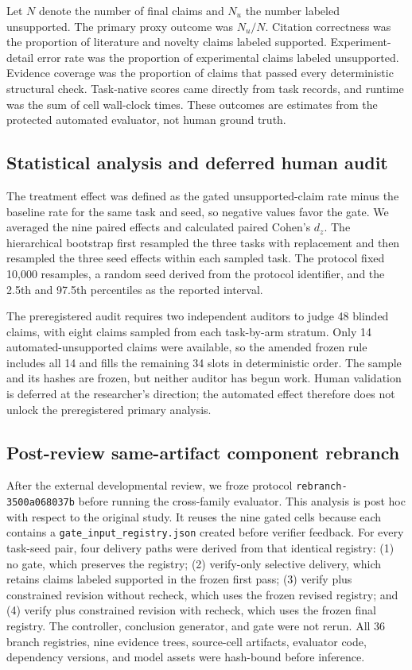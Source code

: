 \documentclass[11pt]{article}
\begin{document}
Let $N$ denote the number of final claims and $N_u$ the number labeled unsupported. The primary proxy outcome was $N_u/N$. Citation correctness was the proportion of literature and novelty claims labeled supported. Experiment-detail error rate was the proportion of experimental claims labeled unsupported. Evidence coverage was the proportion of claims that passed every deterministic structural check. Task-native scores came directly from task records, and runtime was the sum of cell wall-clock times. These outcomes are estimates from the protected automated evaluator, not human ground truth.

\subsection{Statistical analysis and deferred human audit}

The treatment effect was defined as the gated unsupported-claim rate minus the baseline rate for the same task and seed, so negative values favor the gate. We averaged the nine paired effects and calculated paired Cohen's $d_z$. The hierarchical bootstrap first resampled the three tasks with replacement and then resampled the three seed effects within each sampled task. The protocol fixed 10,000 resamples, a random seed derived from the protocol identifier, and the 2.5th and 97.5th percentiles as the reported interval.

The preregistered audit requires two independent auditors to judge 48 blinded claims, with eight claims sampled from each task-by-arm stratum. Only 14 automated-unsupported claims were available, so the amended frozen rule includes all 14 and fills the remaining 34 slots in deterministic order. The sample and its hashes are frozen, but neither auditor has begun work. Human validation is deferred at the researcher's direction; the automated effect therefore does not unlock the preregistered primary analysis.

\subsection{Post-review same-artifact component rebranch}

After the external developmental review, we froze protocol \texttt{rebranch-3500a068037b} before running the cross-family evaluator. This analysis is post hoc with respect to the original study. It reuses the nine gated cells because each contains a \texttt{gate\_input\_registry.json} created before verifier feedback. For every task-seed pair, four delivery paths were derived from that identical registry: (1) no gate, which preserves the registry; (2) verify-only selective delivery, which retains claims labeled supported in the frozen first pass; (3) verify plus constrained revision without recheck, which uses the frozen revised registry; and (4) verify plus constrained revision with recheck, which uses the frozen final registry. The controller, conclusion generator, and gate were not rerun. All 36 branch registries, nine evidence trees, source-cell artifacts, evaluator code, dependency versions, and model assets were hash-bound before inference.
\end{document}
